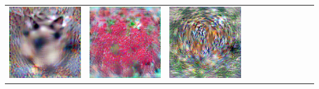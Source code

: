 {\begin{center}
\begin{tabular}{ccccccccccc}
    \includegraphics[align=c,width=\coverwidth\linewidth]{figures/cover/imagenet/siamese_cat_0.pdf} &
    \includegraphics[align=c,width=\coverwidth\linewidth]{figures/cover/imagenet/strawberry_0.pdf} &
    \includegraphics[align=c,width=\coverwidth\linewidth]{figures/cover/imagenet/tiger_0.pdf} \\[7.8ex]

\end{tabular}
\end{center}}
